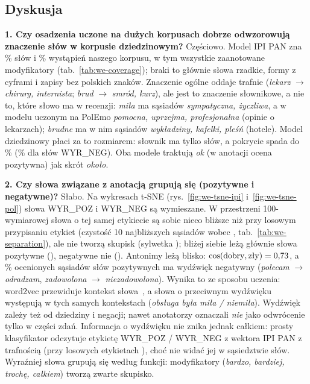 \subsection{Dyskusja}\label{sec:we-dyskusja}

\textbf{1. Czy osadzenia uczone na dużych korpusach dobrze odwzorowują znaczenie słów w korpusie dziedzinowym?}
Częściowo. Model IPI PAN zna \weCovTypesIpi\% słów i \weCovTokensIpi\% wystąpień naszego korpusu, w tym wszystkie
zaanotowane modyfikatory (tab.~\ref{tab:we-coverage}); braki to głównie słowa rzadkie, formy z cyframi i zapisy bez
polskich znaków. Znaczenie ogólne oddaje trafnie (\emph{lekarz} $\to$ \emph{chirurg, internista}; \emph{brud} $\to$
\emph{smród, kurz}), ale jest to znaczenie słownikowe, a nie to, które słowo ma w recenzji: \emph{miła} ma sąsiadów
\emph{sympatyczna, życzliwa}, a w modelu uczonym na PolEmo \emph{pomocna, uprzejma, profesjonalna} (opinie o lekarzach);
\emph{brudne} ma w nim sąsiadów \emph{wykładziny, kafelki, pleśń} (hotele). Model dziedzinowy płaci za to rozmiarem:
słownik ma tylko \weVocabPol{} słów, a pokrycie spada do \weCovTypesPol\% (\weCovNegPol\% dla słów WYR\_NEG). Oba modele
traktują \emph{ok} (w anotacji ocena pozytywna) jak skrót \emph{około}.

\textbf{2. Czy słowa związane z anotacją grupują się (pozytywne i negatywne)?}
Słabo. Na wykresach t-SNE (rys.~\ref{fig:we-tsne-ipi} i~\ref{fig:we-tsne-pol}) słowa WYR\_POZ i WYR\_NEG są wymieszane.
W przestrzeni 100-wymiarowej słowa o tej samej etykiecie są sobie nieco bliższe niż przy losowym przypisaniu etykiet
(czystość 10 najbliższych sąsiadów \wePurityIpi{} wobec \wePurityRandIpi{}, tab.~\ref{tab:we-separation}), ale nie
tworzą skupisk (sylwetka \weSilIpi{}); bliżej siebie leżą głównie słowa pozytywne (\wePurityPozIpi{}), negatywne nie
(\wePurityNegIpi{}). Antonimy leżą blisko: $\cos(\text{dobry},\text{zły})=0{,}73$, a \wePolOppPozIpi\% ocenionych
sąsiadów słów pozytywnych ma wydźwięk negatywny (\emph{polecam} $\to$ \emph{odradzam}, \emph{zadowolona} $\to$
\emph{niezadowolona}). Wynika to ze sposobu uczenia: word2vec przewiduje kontekst słowa~\cite{word2vec}, a słowa
o przeciwnym wydźwięku występują w tych samych kontekstach (\emph{obsługa była miła / niemiła}). Wydźwięk zależy też od
dziedziny i negacji; nawet anotatorzy oznaczali \emph{nie} jako odwrócenie tylko w części zdań. Informacja o wydźwięku
nie znika jednak całkiem: prosty klasyfikator odczytuje etykietę WYR\_POZ / WYR\_NEG z wektora IPI PAN z trafnością
\weProbeIpi{} (przy losowych etykietach \weProbeRandIpi{}), choć nie widać jej w sąsiedztwie słów. Wyraźniej słowa
grupują się według funkcji: modyfikatory (\emph{bardzo, bardziej, trochę, całkiem}) tworzą zwarte skupisko.

